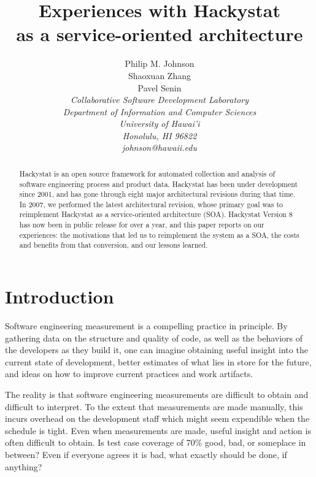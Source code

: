 \documentclass[conference,compsoc]{IEEEtran}
\begin{document}
\title{Experiences with Hackystat \\ as a service-oriented architecture}

\author{Philip M. Johnson \\
        Shaoxuan Zhang \\
        Pavel Senin \\
\em  Collaborative Software Development Laboratory \\
      Department of Information and Computer Sciences \\
      University of Hawai'i \\
      Honolulu, HI 96822 \\
      johnson@hawaii.edu \\
}


\maketitle

\begin{abstract}  %
Hackystat is an open source framework for automated collection and analysis
of software engineering process and product data.  Hackystat has been under
development since 2001, and has gone through eight major architectural
revisions during that time.  In 2007, we performed the latest architectural
revision, whose primary goal was to reimplement Hackystat as a
service-oriented architecture (SOA).  Hackystat Version 8 has now been in
public release for over a year, and this paper reports on our experiences:
the motivations that led us to reimplement the system as a SOA, the
costs and benefits from that conversion, and our lessons learned. 
\end{abstract}


\section{Introduction}
\label{sec:intro}

Software engineering measurement is a compelling practice in principle. By
gathering data on the structure and quality of code, as well as the
behaviors of the developers as they build it, one can imagine obtaining
useful insight into the current state of development, better estimates of
what lies in store for the future, and ideas on how to improve current
practices and work artifacts.

The reality is that software engineering measurements are difficult to
obtain and difficult to interpret. To the extent that measurements are made
manually, this incurs overhead on the development staff which might seem
expendible when the schedule is tight.  Even when measurements are made,
useful insight and action is often difficult to obtain.  Is test case coverage of 70\%
good, bad, or someplace in between? Even if everyone agrees it is bad, what
exactly should be done, if anything?
\end{document}
